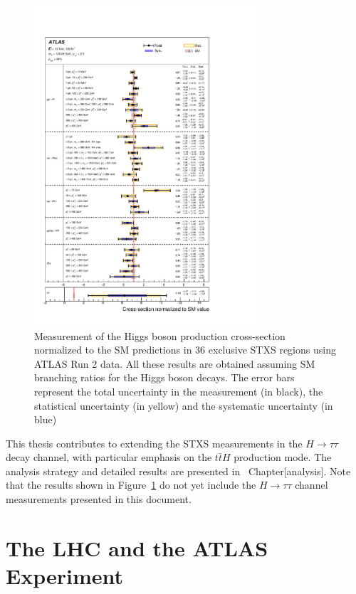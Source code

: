 \documentclass[11pt,twoside]{book}
\begin{document}
\begin{figure}[htbp]
    \centering
    \includegraphics[width=0.75\textwidth]{atlas_stxs_results.pdf}
    \caption{Measurement of the Higgs boson production cross-section normalized to the \acrshort{SM} predictions in 36 exclusive STXS regions using ATLAS Run 2 data. All these results are obtained assuming \acrshort{SM} branching ratios for the Higgs boson decays. The error bars represent the total uncertainty in the measurement (in black), the statistical uncertainty (in yellow) and the systematic uncertainty (in blue) ~\cite{arXiv:2207.00092}}
    \label{fig:atlas-stxs-results}
\end{figure}

This thesis contributes to extending the STXS measurements in the $H \to \tau \tau$ decay channel, with particular emphasis on the $t\bar{t}H$ production mode. The analysis strategy and detailed results are presented in ~Chapter[analysis]. Note that the results shown in Figure~\ref{fig:atlas-stxs-results} do not yet include the $H \to \tau \tau$ channel measurements presented in this document.


\chapter{The LHC and the ATLAS Experiment}
\label{chap:ATLAS}
\end{document}
